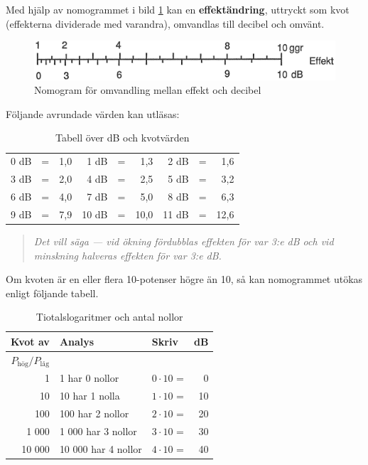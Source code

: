 Med hjälp av nomogrammet i bild \ref{ellära-nomogram-db-effekt} kan en
\textbf{effektändring}, uttryckt som kvot (effekterna dividerade med varandra),
omvandlas till decibel och omvänt.

\begin{figure}
  \includegraphics[width=\textwidth]{images/nomogram_db_effekt.png}  \caption{Nomogram för omvandling mellan effekt och decibel}
  \label{ellära-nomogram-db-effekt}
\end{figure}

Följande avrundade värden kan utläsas:

\begin{table}[h]
\begin{tabular}{rcr|rcr|rcr}
	0 dB & = & 1,0 &  1 dB & = &  1,3 &  2 dB & = &  1,6 \\
	3 dB & = & 2,0 &  4 dB & = &  2,5 &  5 dB & = &  3,2 \\
	6 dB & = & 4,0 &  7 dB & = &  5,0 &  8 dB & = &  6,3 \\
	9 dB & = & 7,9 & 10 dB & = & 10,0 & 11 dB & = & 12,6
\end{tabular}
\caption{Tabell över dB och kvotvärden}
\end{table}

\begin{quote}
	\emph{Det vill säga --- vid ökning fördubblas effekten för var 3:e dB och vid
		 minskning halveras effekten för var 3:e dB.}
\end{quote}

Om kvoten är en eller flera 10-potenser högre än 10, så kan nomogrammet utökas
enligt följande tabell.

\begin{table}[h]
\begin{tabular}{rllr}
	                      Kvot av & Analys              & Skriv            & dB \\ \hline
	\(P_\text{hög}/P_\text{låg}\) &                     &                  &  \\
	                            1 & 1 har 0 nollor      & \(0 \cdot 10\) = &  0 \\
	                           10 & 10 har 1 nolla      & \(1 \cdot 10\) = & 10 \\
	                          100 & 100 har 2 nollor    & \(2 \cdot 10\) = & 20 \\
	                        1 000 & 1 000 har 3 nollor  & \(3 \cdot 10\) = & 30 \\
	                       10 000 & 10 000 har 4 nollor & \(4 \cdot 10\) = & 40
\end{tabular}
\caption{Tiotalslogaritmer och antal nollor}
\end{table}


